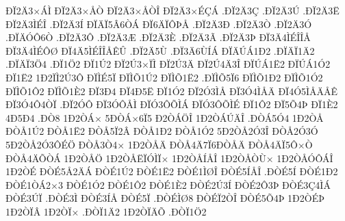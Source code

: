 {^^d0^^cf2^^c43^^d7^^c1^^cc
^^d0^^cf2^^c43^^d7^^c5^^d2
^^d0^^cf2^^c43^^d7^^c5^^d2^^ce
^^d0^^cf2^^c43^^d7^^c9^^c7^^c1
.^^d0^^cf2^^c43^^c7
.^^d0^^cf2^^c43^^da
.^^d0^^cf2^^c43^^cb
^^d0^^cf2^^c43^^cc^^c9^^ce
.^^d0^^cf2^^c43^^cd
^^d0^^cf^^c4^^cf5^^c26^^d2^^c1
^^d0^^cf6^^c4^^cf^^d4^^de^^c5
.^^d0^^cf2^^c43^^d0
.^^d0^^cf2^^c43^^d2
.^^d0^^cf2^^c43^^d3
.^^d0^^cf^^c4^^d3^^d46^^d2
.^^d0^^cf2^^c43^^d4
.^^d0^^cf2^^c43^^c6
.^^d0^^cf2^^c43^^c8
.^^d0^^cf2^^c43^^c3
.^^d0^^cf2^^c43^^de
^^d0^^cf3^^c44^^cc^^c9^^ce^^ce^^c5
^^d0^^cf3^^c44^^cc^^c9^^d4^^d8
^^d0^^cf4^^c45^^cc^^c9^^ce^^ce^^c5^^ca^^db
.^^d0^^cf2^^c45^^d9
.^^d0^^cf3^^c46^^d9^^cd^^c1
^^d0^^cf^^c4^^da^^c11^^d02
.^^d0^^cf^^c4^^cf1^^c42
.^^d0^^cf^^c4^^cf3^^d64
.^^d0^^cf1^^d62
^^d0^^cf1^^da2
^^d0^^cf2^^da3^^d7^^cf^^cc
^^d0^^cf2^^da3^^c4
^^d0^^cf2^^da4^^c43^^ce
^^d0^^cf^^da^^c11^^cb2
^^d0^^cf^^da^^c11^^d32
^^d0^^cf1^^cb2
1^^d02^^cf^^cc2^^da3^^d4
^^d0^^cf^^cc^^c95^^cf
^^d0^^cf^^cc^^d51^^da2
^^d0^^cf^^cc^^d51^^cb2
.^^d0^^cf^^cc^^d55^^cf6
^^d0^^cf^^cc^^d51^^d02
^^d0^^cf^^cc^^d51^^d32
^^d0^^cf^^cc^^d51^^d42
^^d0^^cf^^cc^^d51^^c82
^^d0^^cf3^^d04
^^d0^^cf4^^d05^^cb
^^d0^^cf1^^d32
^^d0^^cf2^^d33^^cc^^c5
^^d0^^cf3^^d34^^cc^^c5^^c4
^^d0^^cf4^^d35^^cc^^c5^^c4^^c5^^ca
^^d0^^cf3^^d34^^d44^^d2^^cf
.^^d0^^cf2^^d3^^d4
^^d0^^cf3^^d3^^d4^^c5^^cc
^^d0^^cf^^d33^^d4^^d5^^cc^^c1
^^d0^^cf^^d33^^d4^^d5^^cc^^c9
^^d0^^cf1^^d42
^^d0^^cf5^^d54^^de
^^d0^^cf1^^c82
4^^d05^^d04
.^^d0^^d28
1^^d02^^d2^^c1^^d7
5^^d0^^d2^^c1^^d76^^cf5
^^d02^^d2^^c1^^d6^^ce
1^^d02^^d2^^c1^^da^^c4^^ce
.^^d0^^d2^^c15^^d34
1^^d02^^d2^^c5
^^d0^^d2^^c51^^da2
^^d0^^d2^^c51^^cb2
^^d0^^d2^^c55^^cf2^^c2
^^d0^^d2^^c51^^d02
^^d0^^d2^^c51^^d32
5^^d02^^d2^^c52^^d33^^ce
^^d0^^d2^^c52^^d33^^d3
5^^d02^^d2^^c52^^d33^^d4^^c9^^d6
^^d0^^d2^^c53^^d24^^d7
1^^d02^^d2^^c5^^c4
^^d0^^d2^^c54^^c47^^cf6^^d0^^d2^^c5^^c4
^^d0^^d2^^c54^^c4^^cf5^^d4^^d7^^d2
^^d0^^d2^^c54^^c4^^d5^^d2^^c1
1^^d02^^d2^^c5^^d6
1^^d02^^d2^^c5^^cb^^cf^^d3^^cc^^cf^^d7
1^^d02^^d2^^c5^^cd^^c5^^ce
1^^d02^^d2^^c5^^d2^^d9^^d7
1^^d02^^d2^^c5^^d3^^d4^^c1^^ce
1^^d02^^d2^^c9
^^d0^^d2^^c95^^c52^^c4^^c1
^^d0^^d2^^c91^^da2
^^d0^^d2^^c91^^cb2
^^d0^^d2^^c91^^cc^^d8^^ce
^^d0^^d2^^c95^^cd^^c5^^ce
.^^d0^^d2^^c95^^cd
^^d0^^d2^^c91^^d02
^^d0^^d2^^c91^^d2^^c12^^d73
^^d0^^d2^^c91^^d32
^^d0^^d2^^c91^^d42
^^d0^^d2^^c91^^c82
^^d0^^d2^^c92^^da3^^cd
^^d0^^d2^^c92^^d43^^de
^^d0^^d2^^c93^^c74^^cc^^c1
^^d0^^d2^^c93^^da^^cf
.^^d0^^d2^^c93^^cc
^^d0^^d2^^c93^^cd^^c5
^^d0^^d2^^c95^^cf
.^^d0^^d2^^c9^^cc^^d88
^^d0^^d2^^c9^^cf2^^d2^^ce
^^d0^^d2^^c95^^d54^^de
1^^d02^^d2^^c9^^de
1^^d02^^d2^^cf^^c2
1^^d02^^d2^^cf^^d7
.^^d0^^d2^^cf1^^c42
1^^d02^^d2^^cf^^c4^^d5
.^^d0^^d2^^cf1^^d62
}
